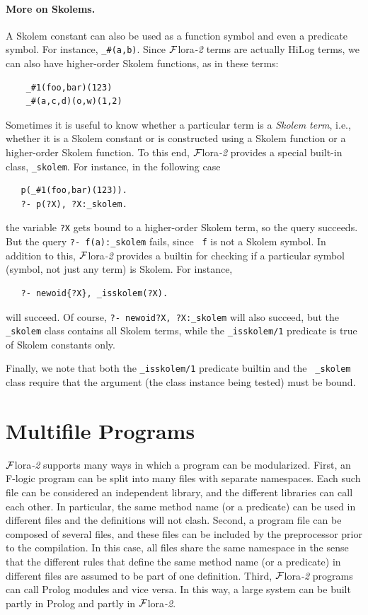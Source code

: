\documentclass[11pt]{article}
\newcommand{\FLORA}{{\mbox{\sc ${\cal F}${lora}\rm\emph{-2}}}\xspace}
\newcommand{\fl}{\mbox{F-logic}\xspace}
\begin{document}
\paragraph{More on Skolems.}
A Skolem constant can also be used as a function symbol and even a
predicate symbol.
For instance,
{\tt \_\#(a,b)}. Since \FLORA terms are actually HiLog terms, we can also
have higher-order Skolem functions, as in these terms:
\begin{verbatim}
    _#1(foo,bar)(123)
    _#(a,c,d)(o,w)(1,2)
\end{verbatim}
Sometimes it is useful to know whether a particular term
is a \emph{Skolem term}, i.e., whether it is a Skolem constant or is
constructed using a Skolem function or a higher-order Skolem function.
To this end, \FLORA provides a special built-in class, {\tt \_skolem}. 
For instance, in the following case
\begin{verbatim}
   p(_#1(foo,bar)(123)).
   ?- p(?X), ?X:_skolem.
\end{verbatim}
the variable {\tt ?X} gets bound to a higher-order Skolem term, so 
the query succeeds. But the query {\tt ?- f(a):\_skolem} fails, since {\tt
  f} is not a Skolem symbol.  
In addition to this, \FLORA provides a builtin for checking if a particular
symbol (symbol, not just any term) is Skolem. For instance,
\begin{verbatim}
   ?- newoid{?X}, _isskolem(?X).
\end{verbatim}
will succeed. Of course, {\tt ?- newoid{?X}, ?X:\_skolem}   
will also succeed, but the {\tt \_skolem} class contains all Skolem terms,
while the {\tt \_isskolem/1} predicate is true of Skolem constants only.

Finally, we note that both the {\tt \_isskolem/1} predicate builtin and the {\tt
  \_skolem} class require that the argument (the class
instance being tested) must be bound.





\section{Multifile Programs}

\FLORA supports many ways in which a program can be modularized.  First, an
\fl program can be split into many files with separate namespaces. Each
such file can be considered an independent library, and the different
libraries can call each other. In particular, the same method name (or a
predicate) can be used in different files and the definitions will not
clash.  Second, a program file can be composed of several files, and these
files can be included by the preprocessor prior to the compilation. In this
case, all files share the same namespace in the sense that the different
rules that define the same method name (or a predicate) in different files
are assumed to be part of one definition. Third, \FLORA programs can call
Prolog modules and vice versa. In this way, a large system can be built partly
in Prolog and partly in \FLORA.
\end{document}
